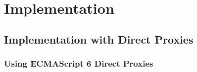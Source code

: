 \chapter{Implementation} \label{sec:IMPLEMENTATION}

\section{Implementation with Direct Proxies}

% 
% 

\subsection{Using ECMAScript 6 Direct Proxies}




